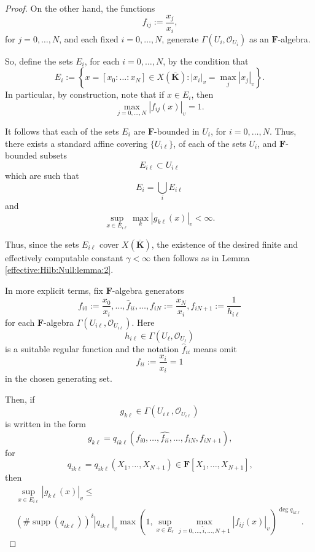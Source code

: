\documentclass[10pt]{amsart}
\renewcommand{\leq}{\leqslant}
\newcommand{\Osh}{{\mathcal O}}                        %
\newcommand{\KK}{\mathbf{K}}
\newcommand{\FF}{\mathbf{F}}
\theoremstyle{definition}
\numberwithin{equation}{section}
\begin{document}
\begin{proof}
On the other hand, the functions
$$
f_{ij} := \frac{x_j}{x_i} \text{,}
$$
for $j = 0,\dots,N$, and each fixed $ i = 0, \dots, N$, generate $\Gamma(U_i,\Osh_{U_i})$ as an $\FF$-algebra.

So, define the sets $E_i$, for each $i = 0,\dots,N$, by the condition that
$$
E_i := \left\{ x = [x_0:\dots:x_N] \in X(\overline{\KK}) : |x_i|_v = \max_j |x_j|_v \right\} \text{.}
$$
In particular, by construction, note that if $x \in E_i$, then
$$
\max_{j=0,\dots,N} \left| f_{ij}(x) \right|_v = 1 \text{.}
$$



It follows that each of the sets $E_i$ are $\FF$-bounded in $U_i$, for $i = 0,\dots,N$.  Thus, there exists a standard affine covering $\{U_{i \ell}\}$, of each of the sets $U_i$, and $\FF$-bounded subsets
$$
E_{i \ell} \subset U_{i\ell}
$$
which are such that 
$$
E_i = \bigcup_{i} E_{i\ell}
$$
and 
$$
\sup_{x \in E_{i \ell}} \max_k \left| g_{k \ell}(x) \right|_v < \infty \text{.}
$$


Thus, since the sets $E_{i \ell}$ cover $X(\overline{\KK})$, the existence of the desired finite and effectively computable constant $\gamma < \infty$ then follows as in Lemma \ref{effective:Hilb:Null:lemma:2}.


In more explicit terms, fix $\FF$-algebra generators
$$
f_{i0} := \frac{x_0}{x_i} , \dots, \hat{f}_{ii},\dots,f_{iN}:= \frac{x_N}{x_i}, f_{iN+1} := \frac{1}{h_{i\ell}}
$$
for each $\FF$-algebra $\Gamma(U_{i\ell},\Osh_{U_{i\ell}})$.  Here
$$
h_{i\ell} \in \Gamma(U_\ell,\Osh_{U_\ell})
$$
is a suitable regular function and the notation 
$
\hat{f}_{ii} 
$
means omit
$$
f_{ii} := \frac{x_i}{x_i} = 1
$$
in the chosen generating set.

Then, if 
$$
g_{k\ell} \in \Gamma(U_{i\ell},\Osh_{U_{i\ell}})
$$
is written in the form
$$
g_{k\ell} = q_{ik\ell}(f_{i0},\dots,\hat{f_{ii}},\dots,f_{iN},f_{iN+1}) \text{,}
$$
for
$$
q_{ik\ell} = q_{ik\ell}(X_1,\dots,X_{N+1}) \in \FF[X_1,\dots,X_{N+1}] \text{,}
$$
then 
\begin{multline*}
\sup_{x \in E_{i \ell}} \left| g_{k\ell}(x) \right|_v \leq \\ 
\left( \# \operatorname{supp}(q_{ik\ell}) \right)^{\delta} \left|q_{ik\ell} \right|_v \max\left(1,\sup_{x \in E_{\ell}} \max_{j=0,\dots, \hat{i}, \dots,N+1} |f_{ij}(x)|_v\right)^{\deg q_{ik\ell}} \text{.}
\end{multline*}


\end{proof}
\end{document}

